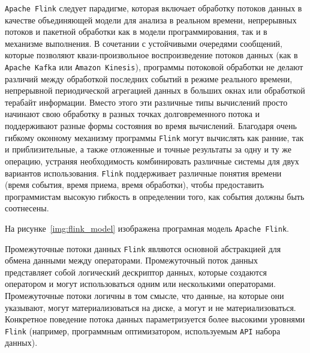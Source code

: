 \texttt{Apache Flink} следует парадигме, которая включает обработку потоков данных в качестве объединяющей модели для анализа в реальном времени, непрерывных потоков и пакетной обработки как в модели программирования, так и в механизме выполнения.
В сочетании с устойчивыми очередями сообщений, которые позволяют квази-произвольное воспроизведение потоков данных (как в \texttt{Apache Kafka} или \texttt{Amazon Kinesis}), программы потоковой обработки не делают различий между обработкой последних событий в режиме реального времени, непрерывной периодической агрегацией данных в больших окнах или обработкой терабайт информации.
Вместо этого эти различные типы вычислений просто начинают свою обработку в разных точках долговременного потока и поддерживают разные формы состояния во время вычислений. 
Благодаря очень гибкому оконному механизму программы \texttt{Flink} могут вычислять как ранние, так и приблизительные, а также отложенные и точные результаты за одну и ту же операцию, устраняя необходимость комбинировать различные системы для двух вариантов использования. 
\texttt{Flink} поддерживает различные понятия времени (время события, время приема, время обработки), чтобы предоставить программистам высокую гибкость в определении того, как события должны быть соотнесены.

На рисунке~\ref{img:flink_model} изображена програмная модель \texttt{Apache Flink}.


Промежуточные потоки данных \texttt{Flink} являются основной абстракцией для обмена данными между операторами. 
Промежуточный поток данных представляет собой логический дескриптор данных, которые создаются оператором и могут использоваться одним или несколькими операторами.
Промежуточные потоки логичны в том смысле, что данные, на которые они указывают, могут материализоваться на диске, а могут и не материализоваться. 
Конкретное поведение потока данных параметризуется более высокими уровнями \texttt{Flink} (например, программным оптимизатором, используемым \texttt{API} набора данных).

